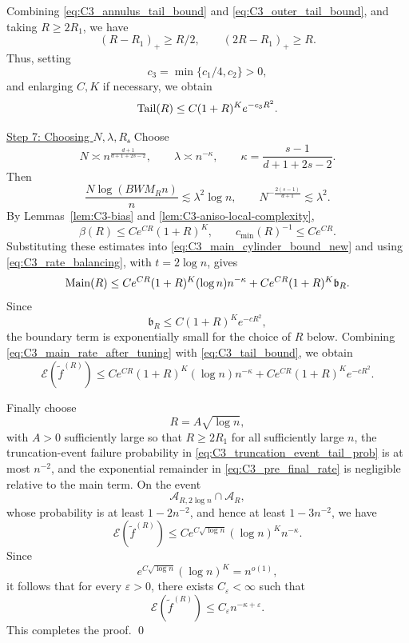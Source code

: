 \documentclass[11pt]{article}
\theoremstyle{plain}
\theoremstyle{definition}
\theoremstyle{remark}
\newcommand{\proofstep}[1]{\par\medskip\noindent\uline{#1}}
\begin{document}
Combining \eqref{eq:C3_annulus_tail_bound} and
\eqref{eq:C3_outer_tail_bound}, and taking \(R\ge2R_1\), we have
\[
(R-R_1)_+\ge R/2,
\qquad
(2R-R_1)_+\ge R.
\]
Thus, setting
\[
c_3=\min\{c_1/4,c_2\}>0,
\]
and enlarging \(C,K\) if necessary, we obtain
\begin{equation}
\label{eq:C3_tail_bound}
{\rm Tail}(R)
\le
C(1+R)^K e^{-c_3R^2}.
\end{equation}

\proofstep{Step 7: Choosing \(N,\lambda,R\).}
Choose
\begin{equation}
\label{eq:C3_N_lambda_choice}
N\asymp n^{\frac{d+1}{d+1+2s-2}},
\qquad
\lambda\asymp n^{-\kappa},
\qquad
\kappa=\frac{s-1}{d+1+2s-2}.
\end{equation}
Then
\begin{equation}
\label{eq:C3_rate_balancing}
\frac{N\log(BWM_Rn)}{n}
\lesssim
\lambda^2\log n,
\qquad
N^{-\frac{2(s-1)}{d+1}}
\lesssim
\lambda^2.
\end{equation}
By Lemmas~\ref{lem:C3-bias} and
\ref{lem:C3-aniso-local-complexity},
\[
\beta(R)\le C e^{CR}(1+R)^K,
\qquad
c_{\min}(R)^{-1}\le C e^{CR}.
\]
Substituting these estimates into
\eqref{eq:C3_main_cylinder_bound_new} and using
\eqref{eq:C3_rate_balancing}, with \(t=2\log n\), gives
\begin{equation}
\label{eq:C3_main_rate_after_tuning}
{\rm Main}(R)
\le
C e^{CR}(1+R)^K(\log n)n^{-\kappa}
+
C e^{CR}(1+R)^K\mathfrak b_R.
\end{equation}
Since
\[
\mathfrak b_R\le C(1+R)^K e^{-cR^2},
\]
the boundary term is exponentially small for the choice of \(R\) below.
Combining \eqref{eq:C3_main_rate_after_tuning} with
\eqref{eq:C3_tail_bound}, we obtain
\begin{equation}
\label{eq:C3_pre_final_rate}
\mathcal E(\widetilde f^{(R)})
\le
C e^{CR}(1+R)^K(\log n)n^{-\kappa}
+
C e^{CR}(1+R)^K e^{-cR^2}.
\end{equation}

Finally choose
\[
R=A\sqrt{\log n},
\]
with \(A>0\) sufficiently large so that \(R\ge2R_1\) for all sufficiently
large \(n\), the truncation-event failure probability in
\eqref{eq:C3_truncation_event_tail_prob} is at most \(n^{-2}\), and the exponential
remainder in \eqref{eq:C3_pre_final_rate} is negligible relative to the
main term. On the event
\[
\mathcal A_{R,2\log n}\cap\mathcal A_R,
\]
whose probability is at least \(1-2n^{-2}\), and hence at least
\(1-3n^{-2}\), we have
\begin{equation}
\label{eq:C3_final_n_o1_rate}
\mathcal E(\widetilde f^{(R)})
\le
C e^{C\sqrt{\log n}}(\log n)^K n^{-\kappa}.
\end{equation}
Since
\[
e^{C\sqrt{\log n}}(\log n)^K=n^{o(1)},
\]
it follows that for every \(\varepsilon>0\), there exists
\(C_\varepsilon<\infty\) such that
\begin{equation}
\label{eq:C3_final_eps_rate}
\mathcal E(\widetilde f^{(R)})
\le
C_\varepsilon n^{-\kappa+\varepsilon}.
\end{equation}
This completes the proof.
\qed
\end{document}

